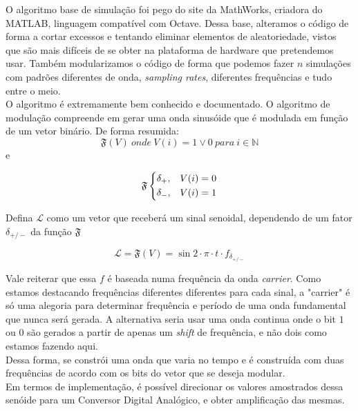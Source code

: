 \documentclass[11pt,a4paper]{report}
\begin{document}
	O algoritmo base de simulação foi pego do site da MathWorks, criadora do MATLAB, linguagem compatível com Octave.  Dessa base, alteramos o código de forma a cortar excessos e tentando eliminar elementos de aleatoriedade, vistos que são mais difíceis de se obter na plataforma de hardware que pretendemos usar. Também modularizamos o código de forma que podemos fazer $n$ simulações com padrões diferentes de onda, {\it sampling rates}, diferentes frequências e tudo entre o meio.\\
	
	O algoritmo é extremamente bem conhecido e documentado. O algoritmo de modulação compreende em gerar uma onda sinusóide que é modulada em função de um vetor binário. De forma resumida:
	\begin{equation}
	\mathfrak{F}(V)\ onde\ V(i) = 1 \lor 0\ para\ i \in \mathbb{N}
	\end{equation}
	e

	\[
	\mathfrak{F}
	\begin{dcases}
	\delta_{+}, & V(i) = 0 \\
	\delta_{-}, & V(i) = 1 \\
	\end{dcases}
	\]


	Defina $\mathcal{L}$ como um vetor que receberá um sinal senoidal, dependendo de um fator $\delta_{+/-}$ da função $\mathfrak{F}$

	\begin{equation}
	\mathcal{L} = \mathfrak{F}(V) = \sin{2 \cdot \pi \cdot t \cdot f_{\delta_{+/-}}}
	\end{equation}
	
	Vale reiterar que essa $f$ é baseada numa frequência da onda {\it carrier}. Como estamos destacando frequências diferentes diferentes para cada sinal, a "carrier" é só uma alegoria para determinar frequência e período de uma onda fundamental que nunca será gerada. A alternativa seria usar uma onda continua onde o bit $1$ ou $0$ são gerados a partir de apenas um {\it shift} de frequência, e não dois como estamos fazendo aqui.\\
	
	Dessa forma, se constrói uma onda que varia no tempo e é construída com duas frequências de acordo com os bits do vetor que se deseja modular.\\
	
	Em termos de implementação, é possível direcionar os valores amostrados dessa senóide para um Conversor Digital Analógico, e obter amplificação das mesmas.\\
	
\end{document}
